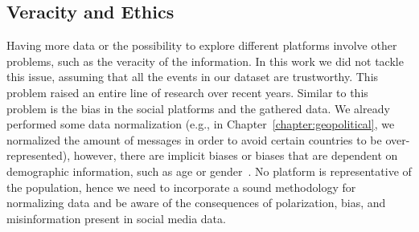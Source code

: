 \subsection*{Veracity and Ethics}
%
Having more data or the possibility to explore different platforms involve other
problems, such as the veracity of the information.
%
In this work we did not tackle this issue, assuming that all the events in our
dataset are trustworthy.
%
This problem raised an entire line of research over recent years.
%
Similar to this problem is the bias in the social platforms and the gathered
data.
%
We already performed some data normalization (e.g., in
Chapter~\ref{chapter:geopolitical}, we normalized the amount of messages in
order to avoid certain countries to be over-represented), however, there are
implicit biases or biases that are dependent on demographic information, such as
age or gender~\cite{Graells-Garrido:2019:RAD:3292522.3326057}.
%
No platform is representative of the population, hence we need to incorporate a
sound methodology for normalizing data and be aware of the consequences of
polarization, bias, and misinformation present in social media data.